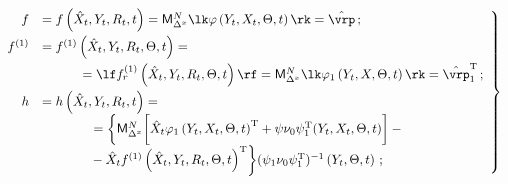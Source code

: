    \begin{equation}

    \left.

    \begin{array}{rl}

    f&=f\left(\hat X_t, Y_t,R_t,t\right)=

    {\sf M}_{\Delta^x}^N \lk \varphi\left(Y_t,X_t,\Theta, t\right)\rk =\hat\vrp\,;

\\[6pt]

f^{(1)}&=f^{(1)}\left(\hat X_t, Y_t,R_t,\Theta, t\right)={}\\[6pt]

&\hspace*{10mm}{}=

\lf f_r^{(1)} \left( \hat X_t, Y_t, R_t,\Theta,  t\right)\rf=

{\sf M}_{\Delta^x}^N \lk  \varphi_1\left(Y_t,X,\Theta, t\right) \rk=\hat\vrp_1^{\mathrm{T}}\,;

\\[6pt]

h&=h\left(\hat X_t, Y_t,R_t,t\right)={}\\

&\hspace*{13mm}{}=\biggl\{{\sf M}_{\Delta^x}^N \biggl[

     \hat X_t\varphi_1\left(Y_t,X_t,\Theta, t\right)^{\mathrm{T}} + 

     \pis (Y_t,X_t,\Theta, t)\biggr]-{}\\[6pt]

&\hspace*{13mm}{} -\hat X_t f^{(1)}\left(\hat X_t, Y_t,R_t,\Theta, t\right)^{\mathrm{T}}\biggr\} \pss^{-1} 

\left(Y_t,\Theta, t\right)\,;

\end{array}

\right\}

\label{e3.3a-s1}

\end{equation}



\noindent

